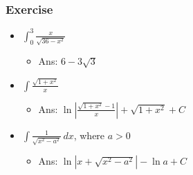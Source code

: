 \documentclass[t]{beamer}
\theoremstyle{plain}
\theoremstyle{definition}
\begin{document}
\begin{frame}
\frametitle{Exercise}

\begin{itemize}
	\item $\int_0^3 \frac{x}{\sqrt{36 - x^2}}$ %
	\begin{itemize}
		\item Ans: $6 - 3\sqrt{3}$
	\end{itemize}
	\item $\int \frac{\sqrt{1 + x^2}}{x}$ %
	\begin{itemize}
		\item Ans: $\ln|\frac{\sqrt{1 + x^2} - 1}{x}| + \sqrt{1 + x^2} + C$
	\end{itemize}
	\item  $\int\frac{1}{\sqrt{x^{2} - a^{2}}}\,dx$, where $a>0$ 
	\begin{itemize}
		\item Ans: $\ln|x + \sqrt{x^2 - a^2}| - \ln{a} + C$ %
	\end{itemize}
\end{itemize}

\end{frame}
\end{document}
